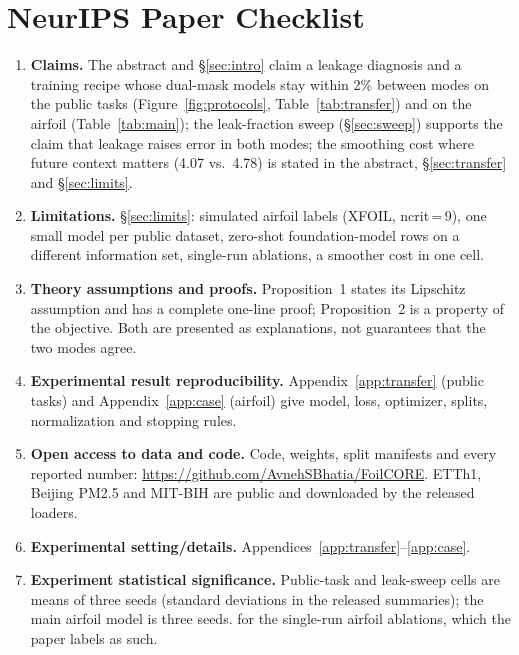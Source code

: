 \section*{NeurIPS Paper Checklist}
\begin{enumerate}\small

\item {\bf Claims.} \answerYes{} The abstract and \S\ref{sec:intro} claim a leakage diagnosis and a training recipe whose dual-mask models stay within 2\% between modes on the public tasks (Figure~\ref{fig:protocols}, Table~\ref{tab:transfer}) and on the airfoil (Table~\ref{tab:main}); the leak-fraction sweep (\S\ref{sec:sweep}) supports the claim that leakage raises error in both modes; the smoothing cost where future context matters (4.07 vs.\ 4.78) is stated in the abstract, \S\ref{sec:transfer} and \S\ref{sec:limits}.

\item {\bf Limitations.} \answerYes{} \S\ref{sec:limits}: simulated airfoil labels (XFOIL, ncrit\,=\,9), one small model per public dataset, zero-shot foundation-model rows on a different information set, single-run ablations, a smoother cost in one cell.

\item {\bf Theory assumptions and proofs.} \answerYes{} Proposition~1 states its Lipschitz assumption and has a complete one-line proof; Proposition~2 is a property of the objective. Both are presented as explanations, not guarantees that the two modes agree.

\item {\bf Experimental result reproducibility.} \answerYes{} Appendix~\ref{app:transfer} (public tasks) and Appendix~\ref{app:case} (airfoil) give model, loss, optimizer, splits, normalization and stopping rules.

\item {\bf Open access to data and code.} \answerYes{} Code, weights, split manifests and every reported number: \url{https://github.com/AvnehSBhatia/FoilCORE}. ETTh1, Beijing PM2.5 and MIT-BIH are public and downloaded by the released loaders.

\item {\bf Experimental setting/details.} \answerYes{} Appendices~\ref{app:transfer}--\ref{app:case}.

\item {\bf Experiment statistical significance.} \answerYes{} Public-task and leak-sweep cells are means of three seeds (standard deviations in the released summaries); the main airfoil model is three seeds. \answerNo{} for the single-run airfoil ablations, which the paper labels as such.


\end{enumerate}
